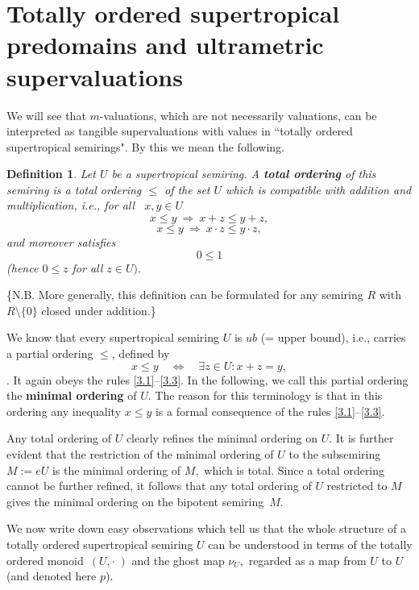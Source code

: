 \documentclass [12pt,a4paper,reqno]{amsart}
\newtheorem{defn}[thm]{Definition}
\begin{document}
\section{Totally ordered supertropical predomains and ultrametric supervaluations}\label{sec:3}

We will see that $m$-valuations, which are not necessarily
valuations, can be interpreted as tangible supervaluations with
values in ``totally ordered supertropical semirings". By this we
mean the following.

\begin{defn}\label{defn3.1}
Let $U$ be a supertropical semiring. A {\textbf{{total ordering}}} of
this semiring is a total ordering $\le$ of the set $U$ which is
compatible with addition and multiplication, i.e., for all~
$x,y\in U$
\begin{equation}\label{3.1}
x\le y \ \Rightarrow \ x+z\le y+z,
\end{equation}
\begin{equation}\label{3.2}
x\le y \ \Rightarrow \ x \cdot   z \leq y \cdot  z,
\end{equation}
and moreover satisfies
\begin{equation}\label{3.3}
0\le1
\end{equation}
(hence $0\le z$ for all $z\in U).$
\end{defn}

\{N.B. More generally, this definition can be formulated for any
semiring
 $R$ with
$R\setminus\{0\}$ closed under addition.\}

We know that every supertropical semiring $U$ is $ub$ (= upper
bound), i.e., carries a partial ordering $\le$, defined by
$$x\le y {\quad {\Leftrightarrow} \quad } \exists z\in U: x+z=y,$$
\cite[Proposition 11.9]{IKR1}. It  again obeys the rules
\eqref{3.1}--\eqref{3.3}. In the following, we call this partial
ordering the {\textbf{{minimal ordering}}} of $U.$ The reason for this
terminology is that in this ordering any inequality $x\le y$ is a
formal consequence of the rules \eqref{3.1}--\eqref{3.3}.

Any total ordering of $U$ clearly refines the minimal ordering on
$U.$ It is further evident that the restriction of the minimal
ordering of $U$ to the subsemiring $M:=eU$ is the minimal ordering
of $M,$ which is total. Since a total ordering cannot be further
refined, it follows that any total ordering of $U$ restricted to
$M$ gives the minimal ordering on the bipotent semiring~$M.$

We now write down  easy observations which tell us that the whole
structure of a totally ordered supertropical semiring $U$ can be
understood in terms of the totally ordered monoid~$(U,\cdot \; )$
and the ghost map $\nu_U,$ regarded as a map from $U$ to $U$ (and
denoted here $p$).
\end{document}
